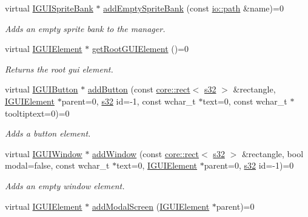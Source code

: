 \begin{DoxyCompactItemize}
virtual \hyperlink{classirr_1_1gui_1_1IGUISpriteBank}{I\+G\+U\+I\+Sprite\+Bank} $\ast$ \hyperlink{classirr_1_1gui_1_1IGUIEnvironment_a62f34cdf4dd600a35eaf37d856579d98}{add\+Empty\+Sprite\+Bank} (const \hyperlink{namespaceirr_1_1io_ab1bdc45edb3f94d8319c02bc0f840ee1}{io\+::path} \&name)=0
\begin{DoxyCompactList}\small\item\em Adds an empty sprite bank to the manager. \end{DoxyCompactList}\item 
virtual \hyperlink{classirr_1_1gui_1_1IGUIElement}{I\+G\+U\+I\+Element} $\ast$ \hyperlink{classirr_1_1gui_1_1IGUIEnvironment_a35fec6d5baa9b2f65aa9ee2c336104d4}{get\+Root\+G\+U\+I\+Element} ()=0
\begin{DoxyCompactList}\small\item\em Returns the root gui element. \end{DoxyCompactList}\item 
virtual \hyperlink{classirr_1_1gui_1_1IGUIButton}{I\+G\+U\+I\+Button} $\ast$ \hyperlink{classirr_1_1gui_1_1IGUIEnvironment_a666749b7352a677c74acb242199e54a0}{add\+Button} (const \hyperlink{classirr_1_1core_1_1rect}{core\+::rect}$<$ \hyperlink{namespaceirr_ac66849b7a6ed16e30ebede579f9b47c6}{s32} $>$ \&rectangle, \hyperlink{classirr_1_1gui_1_1IGUIElement}{I\+G\+U\+I\+Element} $\ast$parent=0, \hyperlink{namespaceirr_ac66849b7a6ed16e30ebede579f9b47c6}{s32} id=-\/1, const wchar\+\_\+t $\ast$text=0, const wchar\+\_\+t $\ast$tooltiptext=0)=0
\begin{DoxyCompactList}\small\item\em Adds a button element. \end{DoxyCompactList}\item 
virtual \hyperlink{classirr_1_1gui_1_1IGUIWindow}{I\+G\+U\+I\+Window} $\ast$ \hyperlink{classirr_1_1gui_1_1IGUIEnvironment_ac233dcbef643b5f7de9ab30ae5896e28}{add\+Window} (const \hyperlink{classirr_1_1core_1_1rect}{core\+::rect}$<$ \hyperlink{namespaceirr_ac66849b7a6ed16e30ebede579f9b47c6}{s32} $>$ \&rectangle, bool modal=false, const wchar\+\_\+t $\ast$text=0, \hyperlink{classirr_1_1gui_1_1IGUIElement}{I\+G\+U\+I\+Element} $\ast$parent=0, \hyperlink{namespaceirr_ac66849b7a6ed16e30ebede579f9b47c6}{s32} id=-\/1)=0
\begin{DoxyCompactList}\small\item\em Adds an empty window element. \end{DoxyCompactList}\item 
virtual \hyperlink{classirr_1_1gui_1_1IGUIElement}{I\+G\+U\+I\+Element} $\ast$ \hyperlink{classirr_1_1gui_1_1IGUIEnvironment_a8bdf2e97e3694da75205ad693d849219}{add\+Modal\+Screen} (\hyperlink{classirr_1_1gui_1_1IGUIElement}{I\+G\+U\+I\+Element} $\ast$parent)=0

\end{DoxyCompactItemize}
